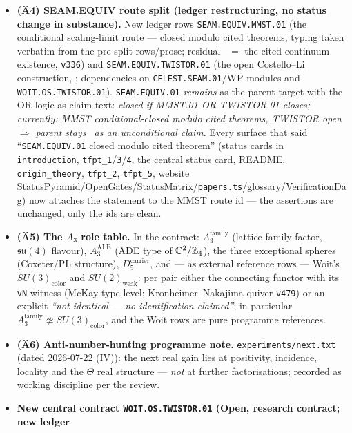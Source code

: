 \begin{itemize}[leftmargin=1.5em]
(arithmetic) or \mO\ (quantisation question); ``$\mathbb{PT}/\Z_4$'' is defined once for the whole
contract (quotient by $\Gamma_{\mathrm{ALE}}$, normalised by $\langle\rho\rangle$) with a
cross-reference sentence in \texttt{tfpt\_3}.
\item \textbf{(\"A4) SEAM.EQUIV route split (ledger restructuring, no status change in substance).}
New ledger rows \texttt{SEAM.EQUIV.MMST.01} (the conditional scaling-limit route --- closed modulo
cited theorems, typing taken verbatim from the pre-split rows/prose; residual \mO\ $=$ the cited
continuum existence, \texttt{v336}) and \texttt{SEAM.EQUIV.TWISTOR.01} (the open Costello--Li
construction, \mO; dependencies on \texttt{CELEST.SEAM.01}/WP modules and
\texttt{WOIT.OS.TWISTOR.01}). \texttt{SEAM.EQUIV.01} \emph{remains} as the parent target with the OR
logic as claim text: \emph{closed if MMST.01 OR TWISTOR.01 closes; currently: MMST
conditional-closed modulo cited theorems, TWISTOR open $\Rightarrow$ parent stays \mO\ as an
unconditional claim}. Every surface that said ``\texttt{SEAM.EQUIV.01} closed modulo cited
theorem'' (status cards in \texttt{introduction}, \texttt{tfpt\_1}/\texttt{3}/\texttt{4}, the
central status card, README, \texttt{origin\_theory}, \texttt{tfpt\_2}, \texttt{tfpt\_5}, website
StatusPyramid/OpenGates/StatusMatrix/\texttt{papers.ts}/glossary/VerificationDag) now attaches the
statement to the MMST route id --- the assertions are unchanged, only the ids are clean.
\item \textbf{(\"A5) The $A_3$ role table.} In the contract: $A_3^{\mathrm{family}}$ (lattice family
factor, $\mathfrak{su}(4)$ flavour), $A_3^{\mathrm{ALE}}$ (ADE type of $\mathbb C^2/\mathbb{Z}_4$), the
three exceptional spheres (Coxeter/PL structure), $D_5^{\mathrm{carrier}}$, and --- as external
reference rows --- Woit's $SU(3)_{\mathrm{color}}$ and $SU(2)_{\mathrm{weak}}$: per pair either the
connecting functor with its \texttt{vN} witness (McKay type-level; Kronheimer--Nakajima quiver
\texttt{v479}) or an explicit \emph{``not identical --- no identification claimed''}; in particular
$A_3^{\mathrm{family}}\not\simeq SU(3)_{\mathrm{color}}$, and the Woit rows are pure programme
references.
\item \textbf{(\"A6) Anti-number-hunting programme note.} \texttt{experiments/next.txt} (dated
2026-07-22 (IV)): the next real gain lies at positivity, incidence, locality and the $\Theta$ real
structure --- \emph{not} at further factorisations; recorded as working discipline per the review.
\item \textbf{New central contract \texttt{WOIT.OS.TWISTOR.01} (Open, research contract; new ledger
}
\end{itemize}
